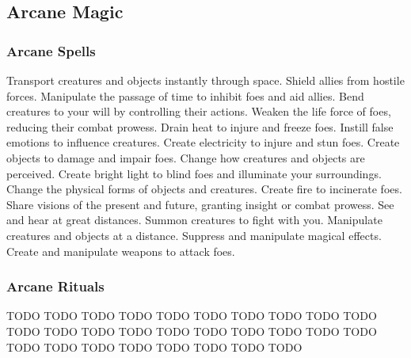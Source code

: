 
\small
\subsection{Arcane Magic}\label{Arcane Magic}
\subsubsection{Arcane Spells}\label{Arcane Spells}
\begin{spelllist}
 Transport creatures and objects instantly through space.
 Shield allies from hostile forces.
 Manipulate the passage of time to inhibit foes and aid allies.
 Bend creatures to your will by controlling their actions.
 Weaken the life force of foes, reducing their combat prowess.
 Drain heat to injure and freeze foes.
 Instill false emotions to influence creatures.
 Create electricity to injure and stun foes.
 Create objects to damage and impair foes.
 Change how creatures and objects are perceived.
 Create bright light to blind foes and illuminate your surroundings.
 Change the physical forms of objects and creatures.
 Create fire to incinerate foes.
 Share visions of the present and future, granting insight or combat prowess.
 See and hear at great distances.
 Summon creatures to fight with you.
 Manipulate creatures and objects at a distance.
 Suppress and manipulate magical effects.
 Create and manipulate weapons to attack foes.
\end{spelllist}

\subsubsection{Arcane Rituals}\label{Arcane Rituals}
\begin{spelllist}
 TODO
 TODO
 TODO
 TODO
 TODO
 TODO
 TODO
 TODO
 TODO
 TODO
 TODO
 TODO
 TODO
 TODO
 TODO
 TODO
 TODO
 TODO
 TODO
 TODO
 TODO
 TODO
 TODO
 TODO
 TODO
 TODO
 TODO
 TODO
\end{spelllist}



